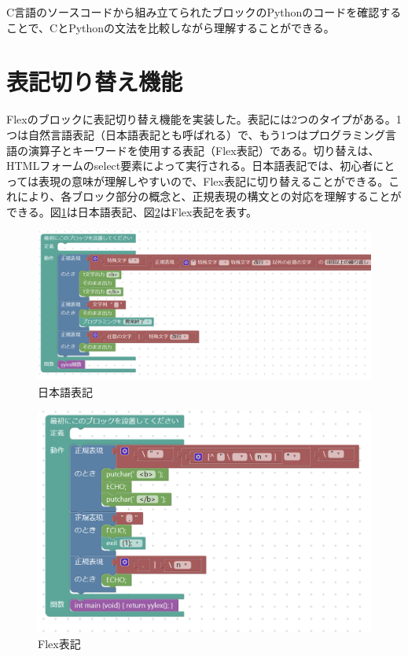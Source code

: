 \documentclass{risepaper}
\begin{document}
C言語のソースコードから組み立てられたブロックのPythonのコードを確認することで、CとPythonの文法を比較しながら理解することができる。
   
   \section{表記切り替え機能}
   
Flexのブロックに表記切り替え機能を実装した。表記には2つのタイプがある。1つは自然言語表記（日本語表記とも呼ばれる）で、もう1つはプログラミング言語の演算子とキーワードを使用する表記（Flex表記）である。切り替えは、HTMLフォームのselect要素によって実行される。日本語表記では、初心者にとっては表現の意味が理解しやすいので、Flex表記に切り替えることができる。これにより、各ブロック部分の概念と、正規表現の構文との対応を理解することができる。図\ref{fig:switching_ja}は日本語表記、図\ref{fig:switching_flex}はFlex表記を表す。

\begin{figure}[h]
\begin{center}
\includegraphics[scale=0.5]{img/switching_ja.PNG}
\caption{日本語表記}%
\label{fig:switching_ja}
\end{center}%
\end{figure}%

\begin{figure}[h]
\begin{center}
\includegraphics[scale=0.5]{img/switching_flex.PNG}
\caption{Flex表記}%
\label{fig:switching_flex}
\end{center}%
\end{figure}%
\end{document}
